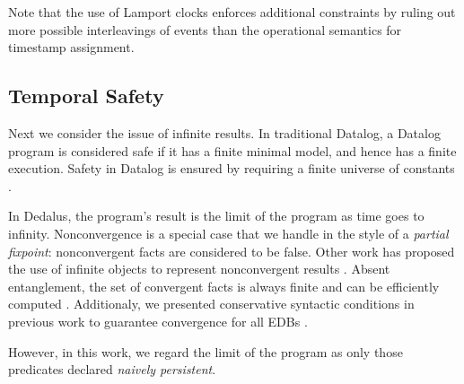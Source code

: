 Note that the use of Lamport clocks enforces additional constraints by ruling out more possible interleavings of events than the operational semantics for timestamp assignment. 

\subsection{Temporal Safety}

Next we consider the issue of infinite results.  In traditional Datalog, a Datalog program is considered safe if it has a finite
minimal model, and hence has a finite execution. Safety in Datalog is ensured by requiring a finite universe of constants .

In Dedalus, the program's result is the limit of the program as time goes to infinity.  Nonconvergence is a special case that we handle in the style of a {\em partial fixpoint}: nonconvergent facts are considered to be false.  Other work has proposed the use of infinite objects to represent nonconvergent results .  Absent entanglement, the set of convergent facts is always finite and can be efficiently computed .  Additionaly, we presented conservative syntactic conditions in previous work to guarantee convergence for all EDBs .

However, in this work, we regard the limit of the program as only those predicates declared {\em naively persistent}.  




